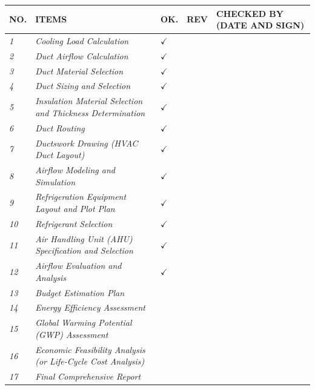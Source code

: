 \documentclass[12pt,a4paper,twoside,openright]{book}
\theoremstyle{definition}
\theoremstyle{plain}
\theoremstyle{remark}
\begin{document}
\vspace{1em}
\begin{center}
\footnotesize
\renewcommand{\arraystretch}{1.4}
\begin{tabular}{|p{0.8cm}|p{5.8cm}|p{1.0cm}|p{1.0cm}|p{3.0cm}|}
\hline
\textbf{NO.} & \textbf{ITEMS} & \textbf{OK.} & \textbf{REV} & \textbf{CHECKED BY (DATE AND SIGN)} \\
\hline
\textit{1} & \textit{Cooling Load Calculation} & $\checkmark$ & & \\
\hline
\textit{2} & \textit{Duct Airflow Calculation} & $\checkmark$ & & \\
\hline
\textit{3} & \textit{Duct Material Selection} & $\checkmark$ & & \\
\hline
\textit{4} & \textit{Duct Sizing and Selection} & $\checkmark$ & & \\
\hline
\textit{5} & \textit{Insulation Material Selection and Thickness Determination} & $\checkmark$ & & \\
\hline
\textit{6} & \textit{Duct Routing} & $\checkmark$ & & \\
\hline
\textit{7} & \textit{Ductswork Drawing (HVAC Duct Layout)} & $\checkmark$ & & \\
\hline
\textit{8} & \textit{Airflow Modeling and Simulation} & $\checkmark$ & & \\
\hline
\textit{9} & \textit{Refrigeration Equipment Layout and Plot Plan} & $\checkmark$ & & \\
\hline
\textit{10} & \textit{Refrigerant Selection} & $\checkmark$ & & \\
\hline
\textit{11} & \textit{Air Handling Unit (AHU) Specification and Selection} & $\checkmark$ & & \\
\hline
\textit{12} & \textit{Airflow Evaluation and Analysis} & $\checkmark$ & & \\
\hline
\textit{13} & \textit{Budget Estimation Plan} & & & \\
\hline
\textit{14} & \textit{Energy Efficiency Assessment} & & & \\
\hline
\textit{15} & \textit{Global Warming Potential (GWP) Assessment} & & & \\
\hline
\textit{16} & \textit{Economic Feasibility Analysis (or Life-Cycle Cost Analysis)} & & & \\
\hline
\textit{17} & \textit{Final Comprehensive Report} & & & \\
\hline
\end{tabular}
\end{center}
\end{document}
